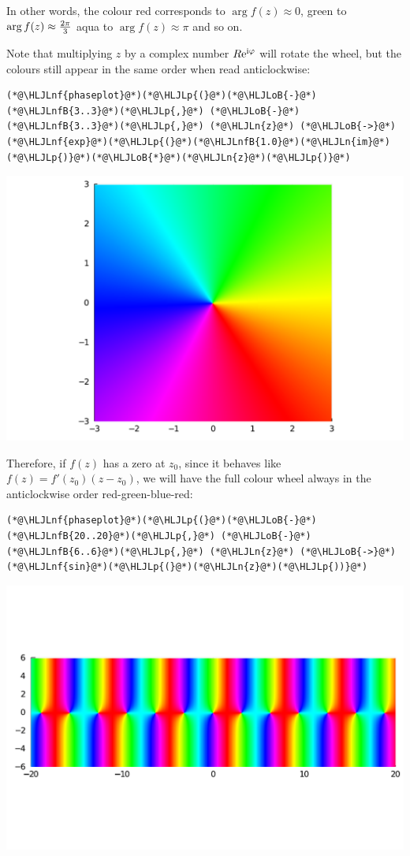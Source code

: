 \documentclass[12pt,a4paper]{article}
\newcommand{\HLJLn}[1]{#1}
\newcommand{\HLJLnf}[1]{\textcolor[RGB]{66,102,213}{#1}}
\newcommand{\HLJLnfB}[1]{\textcolor[RGB]{59,151,46}{#1}}
\newcommand{\HLJLoB}[1]{\textcolor[RGB]{102,102,102}{\textbf{#1}}}
\newcommand{\HLJLp}[1]{#1}
\def\I{ {\rm i} }
\def\E{ {\rm e} }
\begin{document}
In other words, the colour red corresponds to $\arg f(z) \approx 0$, green to $\arg f(z) \approx {2 \pi \over 3}$ aqua to $\arg f(z) \approx \pi$ and so on.

Note that multiplying $z$ by a complex number $R \E^{\I \varphi}$ will rotate the wheel, but the colours still appear in the same order when read anticlockwise:


\begin{lstlisting}
(*@\HLJLnf{phaseplot}@*)(*@\HLJLp{(}@*)(*@\HLJLoB{-}@*)(*@\HLJLnfB{3..3}@*)(*@\HLJLp{,}@*) (*@\HLJLoB{-}@*)(*@\HLJLnfB{3..3}@*)(*@\HLJLp{,}@*) (*@\HLJLn{z}@*) (*@\HLJLoB{->}@*) (*@\HLJLnf{exp}@*)(*@\HLJLp{(}@*)(*@\HLJLnfB{1.0}@*)(*@\HLJLn{im}@*)(*@\HLJLp{)}@*)(*@\HLJLoB{*}@*)(*@\HLJLn{z}@*)(*@\HLJLp{)}@*)
\end{lstlisting}

\includegraphics[width=\linewidth]{figures/Lecture1_6_1.pdf}

Therefore, if $f(z)$ has a zero at $z_0$, since it behaves like $f(z) = f'(z_0) (z - z_0)$, we will have the full colour wheel always in the anticlockwise order red-green-blue-red:


\begin{lstlisting}
(*@\HLJLnf{phaseplot}@*)(*@\HLJLp{(}@*)(*@\HLJLoB{-}@*)(*@\HLJLnfB{20..20}@*)(*@\HLJLp{,}@*) (*@\HLJLoB{-}@*)(*@\HLJLnfB{6..6}@*)(*@\HLJLp{,}@*) (*@\HLJLn{z}@*) (*@\HLJLoB{->}@*) (*@\HLJLnf{sin}@*)(*@\HLJLp{(}@*)(*@\HLJLn{z}@*)(*@\HLJLp{))}@*)
\end{lstlisting}

\includegraphics[width=\linewidth]{figures/Lecture1_7_1.pdf}
\end{document}
